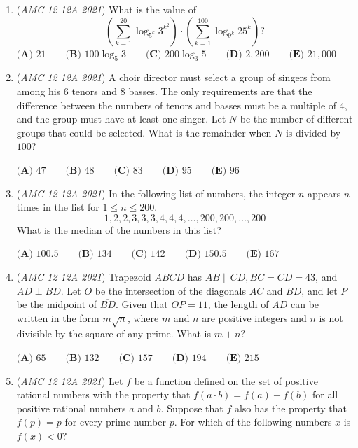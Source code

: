 \begin{enumerate}
 $\textbf{(A) }{-}2 \qquad \textbf{(B) }{-}\sqrt3+i \qquad \textbf{(C) }{-}\sqrt2+\sqrt2 i \qquad \textbf{(D) }{-}1+\sqrt3 i\qquad \textbf{(E) }2i$


	\item (\textit{AMC 12 12A 2021}) What is the value of
 \[\left(\sum_{k=1}^{20} \log_{5^k} 3^{k^2}\right)\cdot\left(\sum_{k=1}^{100} \log_{9^k} 25^k\right)?\]
$\textbf{(A) }21 \qquad \textbf{(B) }100\log_5 3 \qquad \textbf{(C) }200\log_3 5 \qquad \textbf{(D) }2{,}200\qquad \textbf{(E) }21{,}000$


	\item (\textit{AMC 12 12A 2021}) A choir director must select a group of singers from among his $6$ tenors and $8$ basses. The only
requirements are that the difference between the numbers of tenors and basses must be a multiple
of $4$, and the group must have at least one singer. Let $N$ be the number of different groups that could be
selected. What is the remainder when $N$ is divided by $100$?


 $\textbf{(A) } 47\qquad\textbf{(B) } 48\qquad\textbf{(C) } 83\qquad\textbf{(D) } 95\qquad\textbf{(E) } 96\qquad$


	\item (\textit{AMC 12 12A 2021}) In the following list of numbers, the integer $n$ appears $n$ times in the list for $1\le n \le 200$.
 \[1,2,2,3,3,3,4,4,4,\ldots,200,200,\ldots,200\]What is the median of the numbers in this list?


 $\textbf{(A) }100.5 \qquad \textbf{(B) }134 \qquad \textbf{(C) }142 \qquad \textbf{(D) }150.5\qquad \textbf{(E) }167$


	\item (\textit{AMC 12 12A 2021}) Trapezoid $ABCD$ has $\overline{AB}\parallel\overline{CD},BC=CD=43$, and $\overline{AD}\perp\overline{BD}$. Let $O$ be the intersection of the diagonals $\overline{AC}$ and $\overline{BD}$, and let $P$ be the midpoint of $\overline{BD}$. Given that $OP=11$, the length of $AD$ can be written in the form $m\sqrt{n}$, where $m$ and $n$ are positive integers and $n$ is not divisible by the square of any prime. What is $m+n$?


 $\textbf{(A) }65 \qquad \textbf{(B) }132 \qquad \textbf{(C) }157 \qquad \textbf{(D) }194\qquad \textbf{(E) }215$


	\item (\textit{AMC 12 12A 2021}) Let $f$ be a function defined on the set of positive rational numbers with the property that $f(a\cdot b)=f(a)+f(b)$ for all positive rational numbers $a$ and $b$. Suppose that $f$ also has the property that $f(p)=p$ for every prime number $p$. For which of the following numbers $x$ is $f(x)<0$?



\end{enumerate}
